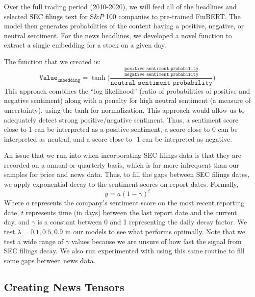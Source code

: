 Over the full trading period (2010-2020), we will feed all of the headlines and selected SEC filings text for S$\&P$ 100 companies to pre-trained FinBERT. 
The model then generates probabilities of the content having a positive, negative, or neutral sentiment. For the news headlines, we developed a novel function to extract a single embedding for a stock on a given day. 

The function that we created is:
\begin{equation}\label{eq:value_embedding}
  \texttt{Value}_{\texttt{Embedding}} = \tanh\Biggl( \frac{\frac{\texttt{positive sentiment probability}}{\texttt{negative sentiment probability}}}{\texttt{neutral sentiment probability}} \Biggr)
\end{equation}
This approach combines the “log likelihood” (ratio of probabilities of positive and 
negative sentiment) along with a penalty for high neutral sentiment (a measure of 
uncertainty), using the tanh for normalization. This approach would allow us to 
adequately detect strong positive/negative sentiment. Thus, a sentiment score close to 1 can be interpreted as a positive sentiment, a score close to 0 can be interpreted as neutral, and a score close to -1 can be intepreted as negative.

An issue that we run into when incorporating SEC filings data is that they are recorded on a annual or quarterly basis, which is far more infrequent than our samples for price and news data.
Thus, to fill the gaps between SEC filings dates, we apply exponential decay to the sentiment scores on report dates. Formally,
\begin{equation}\label{eq:sentiment_deday}
  y = a(1 - \gamma)^t
\end{equation}
Where $a$ represents the company's sentiment score on the most recent reporting date,
$t$ represents time (in days) between the last report date and the current day,
and $\gamma$ is a constant between 0 and 1 representing the daily decay factor.
We test $\lambda = 0.1, 0.5, 0.9$ in our models to see what performs optimally. Note that we test a wide range of $\gamma$ values because we are unsure of how fast the signal from SEC filings decay. We also run experimented with using this same routine to fill some gaps between news data.

\subsection{Creating News Tensors}\label{newstensors}

